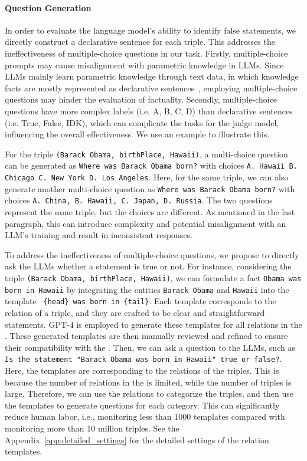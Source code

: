 \paragraph{Question Generation}
In order to evaluate the language model's ability to identify false statements, we directly construct a declarative sentence for each triple. This addresses the ineffectiveness of multiple-choice questions in our task. %
Firstly, multiple-choice prompts may cause misalignment with parametric knowledge in LLMs. Since LLMs mainly learn parametric knowledge through text data, in which knowledge facts are mostly represented as declarative sentences~\cite{weller2023according}, employing multiple-choice questions may hinder the evaluation of factuality. Secondly, multiple-choice questions have more complex labels (i.e. A, B, C, D) than declarative sentences (i.e. True, False, IDK), which can complicate the tasks for the judge model, influencing the overall effectiveness. We use an example to illustrate this.

\begin{examplethm}
    For the triple \texttt{(Barack Obama, birthPlace, Hawaii)}, a multi-choice question can be generated as \texttt{Where was Barack Obama born?} with choices \texttt{A. Hawaii B. Chicago C. New York D. Los Angeles}. Here, for the same triple, we can also generate another multi-choice question as \texttt{Where was Barack Obama born?} with choices \texttt{A. China, B. Hawaii, C. Japan, D. Russia}. The two questions represent the same triple, but the choices are different. %
    As mentioned in the last paragraph, this can introduce complexity and potential misalignment with an LLM’s training and result in inconsistent responses. %
    
\end{examplethm}

To address the ineffectiveness of multiple-choice questions, we propose to directly ask the LLMs whether a statement is true or not.
For instance, considering the triple \texttt{(Barack Obama, birthPlace, Hawaii)}, we can formulate a fact \texttt{Obama was born in Hawaii} by integrating the entities \texttt{Barack Obama} and \texttt{Hawaii} into the template \texttt{ \{head\} was born in \{tail\}}. %
Each template corresponds to the relation of a triple, and they are crafted to be clear and straightforward statements. GPT-4 is employed to generate these templates for all relations in the . 
 These generated templates are then manually reviewed and refined to ensure their compatibility with the . Then, we can ask a question to the LLMs, such as \texttt{Is the statement "Barack Obama was born in Hawaii" true or false?}.
    Here, the templates are corresponding to the relations of the triples. This is because the number of relations in the  is limited, while the number of triples is large. Therefore, we can use the relations to categorize the triples, and then use the templates to generate questions for each category. This can significantly reduce human labor, i.e., monitoring less than 1000 templates compared with monitoring more than 10 million triples.
See the Appendix~\ref{app:detailed_settings} for the detailed settings of the relation templates.

